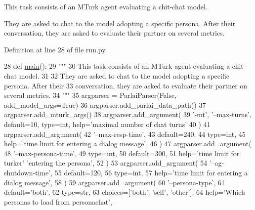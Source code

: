 \begin{DoxyVerb}This task consists of an MTurk agent evaluating a chit-chat model.

They are asked to chat to the model adopting a specific persona. After their
conversation, they are asked to evaluate their partner on several metrics.
\end{DoxyVerb}
 

Definition at line 28 of file run.\+py.


\begin{DoxyCode}
28 \textcolor{keyword}{def }\hyperlink{namespaceprojects_1_1wizard__of__wikipedia_1_1mturk__evaluation__task_1_1run_ad3ab2c71f8083c3112815c0b363d316b}{main}():
29     \textcolor{stringliteral}{"""}
30 \textcolor{stringliteral}{    This task consists of an MTurk agent evaluating a chit-chat model.}
31 \textcolor{stringliteral}{}
32 \textcolor{stringliteral}{    They are asked to chat to the model adopting a specific persona. After their}
33 \textcolor{stringliteral}{    conversation, they are asked to evaluate their partner on several metrics.}
34 \textcolor{stringliteral}{    """}
35     argparser = ParlaiParser(\textcolor{keyword}{False}, add\_model\_args=\textcolor{keyword}{True})
36     argparser.add\_parlai\_data\_path()
37     argparser.add\_mturk\_args()
38     argparser.add\_argument(
39         \textcolor{stringliteral}{'-mt'}, \textcolor{stringliteral}{'--max-turns'}, default=10, type=int, help=\textcolor{stringliteral}{'maximal number of chat turns'}
40     )
41     argparser.add\_argument(
42         \textcolor{stringliteral}{'--max-resp-time'},
43         default=240,
44         type=int,
45         help=\textcolor{stringliteral}{'time limit for entering a dialog message'},
46     )
47     argparser.add\_argument(
48         \textcolor{stringliteral}{'--max-persona-time'},
49         type=int,
50         default=300,
51         help=\textcolor{stringliteral}{'time limit for turker'} \textcolor{stringliteral}{'entering the persona'},
52     )
53     argparser.add\_argument(
54         \textcolor{stringliteral}{'--ag-shutdown-time'},
55         default=120,
56         type=int,
57         help=\textcolor{stringliteral}{'time limit for entering a dialog message'},
58     )
59     argparser.add\_argument(
60         \textcolor{stringliteral}{'--persona-type'},
61         default=\textcolor{stringliteral}{'both'},
62         type=str,
63         choices=[\textcolor{stringliteral}{'both'}, \textcolor{stringliteral}{'self'}, \textcolor{stringliteral}{'other'}],
64         help=\textcolor{stringliteral}{'Which personas to load from personachat'},

\end{DoxyCode}
